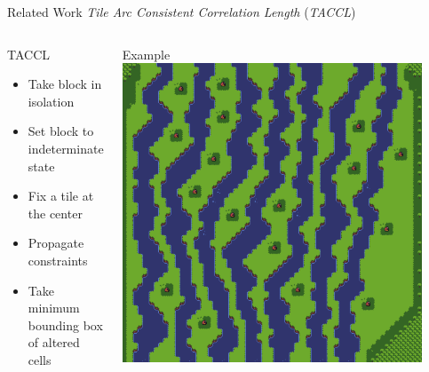 \documentclass{beamer}
\begin{document}
  \begin{frame}[fragile]{Related Work}
    \textit{Tile Arc Consistent Correlation Length} (\textit{TACCL})
    \begin{columns}[T,onlytextwidth]
        \begin{block}{TACCL}
          \hfill \\
          \begin{itemize}
            \item Take block in isolation
            \item Set block to indeterminate state
            \item Fix a tile at the center
            \item Propagate constraints
            \item Take minimum bounding box of altered cells
          \end{itemize}
        \end{block}
        \begin{block}{Example}
          \includegraphics[width=0.9\textwidth]{img/forestmicro_64x64.pdf}
        \end{block}
    \end{columns}
  \end{frame}
\end{document}
